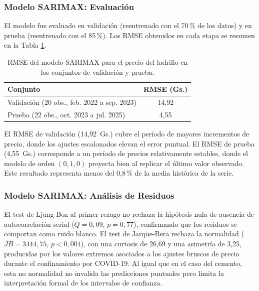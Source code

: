 \subsubsection{Modelo SARIMAX: Evaluación}

\justify
El modelo fue evaluado en validación (reentrenado con el 70\,\% de los datos) y en prueba (reentrenado con el 85\,\%). Los RMSE obtenidos en cada etapa se resumen en la Tabla \ref{tab:sarimax_ladrillo_metricas}.

\begin{table}[H]
    \centering
    \caption{RMSE del modelo SARIMAX para el precio del ladrillo en los conjuntos de validación y prueba.}
    \label{tab:sarimax_ladrillo_metricas}
    \begin{tabular}{lc}
        \toprule
        \textbf{Conjunto} & \textbf{RMSE (Gs.)} \\
        \midrule
        Validación (20 obs., feb. 2022 a sep. 2023) & 14{,}92 \\
        Prueba (22 obs., oct. 2023 a jul. 2025)     & 4{,}55 \\
        \bottomrule
    \end{tabular}
\end{table}

\justify
El RMSE de validación (14{,}92~Gs.) cubre el período de mayores incrementos de precio, donde los ajustes escalonados elevan el error puntual. El RMSE de prueba (4{,}55~Gs.) corresponde a un período de precios relativamente estables, donde el modelo de orden $(0,1,0)$ proyecta bien al replicar el último valor observado. Este resultado representa menos del 0{,}8\,\% de la media histórica de la serie.

\subsubsection{Modelo SARIMAX: Análisis de Residuos}

\justify
El test de Ljung-Box al primer rezago no rechaza la hipótesis nula de ausencia de autocorrelación serial ($Q = 0{,}09$, $p = 0{,}77$), confirmando que los residuos se comportan como ruido blanco. El test de Jarque-Bera rechaza la normalidad ($JB = 3444{,}75$, $p < 0{,}001$), con una curtosis de 26{,}69 y una asimetría de 3{,}25, producidas por los valores extremos asociados a los ajustes bruscos de precio durante el confinamiento por COVID-19. Al igual que en el caso del cemento, esta no normalidad no invalida las predicciones puntuales pero limita la interpretación formal de los intervalos de confianza.

